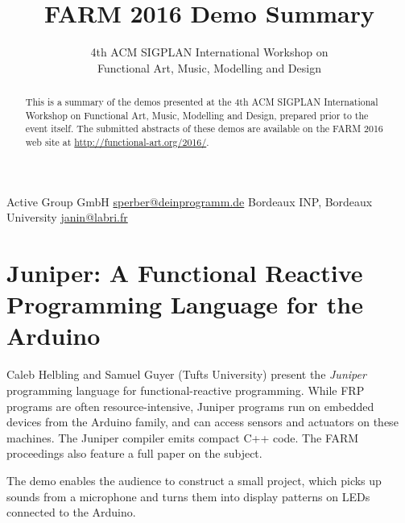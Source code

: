 \documentclass{sigplanconf}
\begin{document}
\toappear

\setlength{\pdfpageheight}{\paperheight}
\setlength{\pdfpagewidth}{\paperwidth}


\title{FARM 2016 Demo Summary}
\subtitle{4th ACM SIGPLAN International Workshop on \\ Functional Art, Music, Modelling and Design}

           {Active Group GmbH}
           {\url{sperber@deinprogramm.de}}
           {Bordeaux INP, Bordeaux University}
           {\url{janin@labri.fr}}

\maketitle

\begin{abstract}
  This is a summary of the demos presented at the 4th ACM SIGPLAN
  International Workshop on Functional Art, Music, Modelling and
  Design, prepared prior to the event itself.  The submitted abstracts
  of these demos are available on the FARM 2016 web site at
  \url{http://functional-art.org/2016/}.
\end{abstract}


\section{Juniper: A Functional Reactive Programming Language for the Arduino}

Caleb Helbling and Samuel Guyer (Tufts University) present the
\textit{Juniper} programming language for functional-reactive
programming.  While FRP programs are often resource-intensive, Juniper
programs run on embedded devices from the Arduino family, and can
access sensors and actuators on these machines.  The Juniper compiler
emits compact C++ code.  The FARM proceedings also feature a full
paper on the subject.

The demo enables the audience to construct a small project, which
picks up sounds from a microphone and turns them into display patterns
on LEDs connected to the Arduino.
\end{document}
